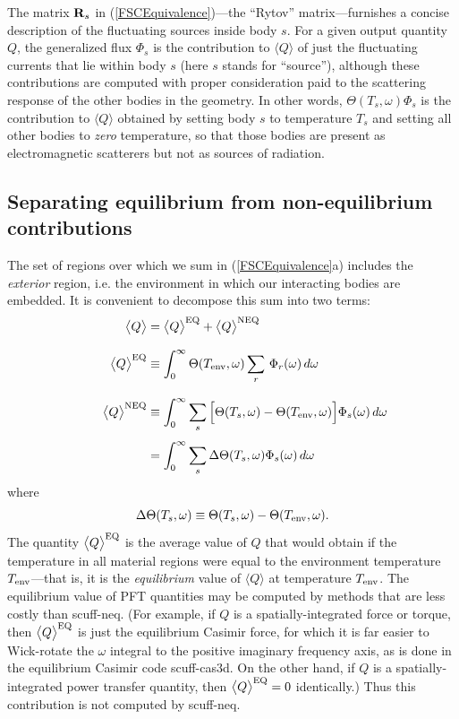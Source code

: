 \documentclass[letterpaper]{article}
\begin{document}
The matrix $\mathbf{R}_s$ in (\ref{FSCEquivalence})---the ``Rytov''
matrix---furnishes a concise description of the fluctuating sources
inside body $s$. For a given output quantity 
$Q$, the generalized flux $\Phi_s$ is the contribution to 
$\langle Q \rangle$ 
of just the fluctuating currents that lie within body $s$
(here $s$ stands for ``source''), although these contributions
are computed with proper consideration paid to the scattering
response of the other bodies in the geometry. In other words,
$\Theta(T_s,\omega)\Phi_s$ is the contribution to 
$\langle Q \rangle$ 
obtained by setting body $s$ to temperature $T_s$ and setting
all other bodies to \textit{zero} temperature, so that those
bodies are present as electromagnetic scatterers but not as 
sources of radiation.

\subsection*{Separating equilibrium from non-equilibrium contributions}

The set of regions over which we sum in (\ref{FSCEquivalence}a) includes
the \textit{exterior} region, i.e. the environment in which
our interacting bodies are embedded. It is convenient to
decompose this sum into two terms:
\begin{align}
 \big\langle Q\big\rangle
&= \big\langle Q\big\rangle^{\text{\scriptsize EQ}} +
   \big\langle Q\big\rangle^{\text{\scriptsize NEQ}}
\\[8pt]
 \big\langle Q\big\rangle^{\text{\scriptsize EQ}}
&\equiv 
  \int_0^\infty \Theta(T_{\text{\scriptsize env}},\omega) \sum_r \,
                   \Phi_r(\omega)\,d\omega 
\\[8pt]
 \qquad \big\langle Q\big\rangle^{\text{\scriptsize NEQ}}
&\equiv 
  \int_0^\infty \sum_s 
  \Big[ \Theta(T_s, \omega) - \Theta(T_{\text{\scriptsize env}},\omega)\Big]
        \Phi_s(\omega)\,d\omega 
\\[4pt]
&=
  \int_0^\infty \sum_s
  \Delta \Theta(T_s, \omega) \Phi_s(\omega)\,d\omega 
\label{QNEQ}
\end{align}
where 
$$ \Delta \Theta(T_s, \omega) \equiv 
   \Theta(T_s, \omega) - \Theta(T_{\text{\scriptsize env}},\omega).
$$
The quantity $\big\langle Q\big\rangle^{\text{\scriptsize EQ}}$
is the average value of $Q$ that would obtain if 
the temperature in all material regions were equal
to the environment temperature $T_{\text{\scriptsize env}}$---that is,
it is the \textit{equilibrium} value of $\big\langle Q\big\rangle$
at temperature $T_{\text{\scriptsize env}}$. The equilibrium value
of PFT quantities may be computed by methods that are 
less costly than {\sc scuff-neq}. (For example,
if $Q$ is a spatially-integrated force or torque, then 
$\big\langle Q\big \rangle^{\text{\scriptsize EQ}}$ is just the equilibrium
Casimir force, for which it is far easier to
Wick-rotate the $\omega$ integral to the positive
imaginary frequency axis, as is done in the
equilibrium Casimir code {\sc scuff-cas3d}. 
On the other hand, if $Q$ is a spatially-integrated
power transfer quantity, then 
$\big\langle Q\big \rangle^{\text{\scriptsize EQ}}=0$ identically.)
Thus this contribution is not computed by {\sc scuff-neq}.
\end{document}
